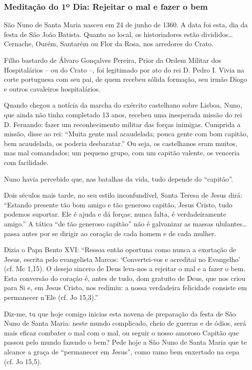 \documentclass[a4paper,14pt]{extarticle} \usepackage[utf8]{inputenc}
\begin{document}
\subsubsection{Meditação do 1º Dia: Rejeitar o mal e fazer o bem}

São Nuno de Santa Maria nasceu em 24 de junho de 1360. A data foi esta, dia da festa de São João Batista. Quanto ao local, os historiadores estão divididos… Cernache, Ourém, Santarém ou Flor da Rosa, nos arredores do Crato.

Filho bastardo de Álvaro Gonçalves Pereira, Prior da Ordem Militar dos Hospitalários – ou do Crato –, foi legitimado por ato do rei D. Pedro I. Vivia na corte portuguesa com seu pai, de quem recebeu sólida formação, seu irmão Diogo e outros cavaleiros hospitalários.

Quando chegou a notícia da marcha do exército castelhano sobre Lisboa, Nuno, que ainda não tinha completado 13 anos, recebeu uma inesperada missão do rei D. Fernando: fazer um reconhecimento militar das forças inimigas. Cumprida a missão, disse ao rei: “Muita gente mal acaudelada; pouca gente com bom capitão, bem acaudelada, os poderia desbaratar.” Ou seja, os castelhanos eram muitos, mas mal comandados; um pequeno grupo, com um capitão valente, os venceria com facilidade.

Nuno havia percebido que, nas batalhas da vida, tudo depende do “capitão”.

Dois séculos mais tarde, no seu estilo inconfundível, Santa Teresa de Jesus dirá: “Estando presente tão bom amigo e tão generoso capitão, Jesus Cristo, tudo podemos suportar. Ele é ajuda e dá forças; nunca falta, é verdadeiramente amigo.” A tática “de tão generoso capitão” não é galvanizar as massas ululantes… passa antes por se dirigir ao coração de cada homem e de cada mulher.

Dizia o Papa Bento XVI: “Ressoa então oportuna como nunca a exortação de Jesus, escrita pelo evangelista Marcos: ‘Convertei-vos e acreditai no Evangelho’ (cf. Mc 1,15). O desejo sincero de Deus leva-nos a rejeitar o mal e a fazer o bem. Esta conversão do coração é, antes de tudo, dom gratuito de Deus, que nos criou para Si e, em Jesus Cristo, nos redimiu: a nossa verdadeira felicidade consiste em permanecer n’Ele (cf. Jo 15,3).”

Diz-me, tu que hoje comigo inicias esta novena de preparação da festa de São Nuno de Santa Maria: neste mundo complicado, cheio de guerras e de ódios, será mais eficaz combater o mal com o mal, ou seguir o nosso amoroso Capitão que passou pelo mundo fazendo o bem? Pede hoje a São Nuno de Santa Maria que te alcance a graça de “permanecer em Jesus”, como ramo bem enxertado na cepa (cf. Jo 15,5).
\end{document}
